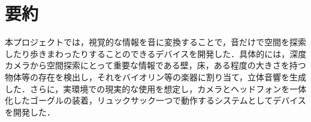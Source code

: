 \section{要約}
本プロジェクトでは，視覚的な情報を音に変換することで，音だけで空間を探索したり歩きまわったりすることのできるデバイスを開発した．具体的には，深度カメラから空間探索にとって重要な情報である壁，床，ある程度の大きさを持つ物体等の存在を検出し，それをバイオリン等の楽器に割り当て，立体音響を生成した．さらに，実環境での現実的な使用を想定し，カメラとヘッドフォンを一体化したゴーグルの装着，リュックサック一つで動作するシステムとしてデバイスを開発した．